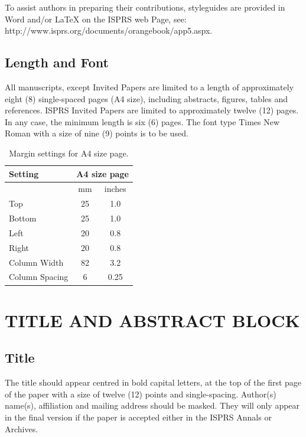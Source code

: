 \documentclass{isprs} %
\begin{document}
To assist authors in preparing their contributions, styleguides are 
provided in Word and/or LaTeX on the ISPRS web Page, see: http://www.isprs.org/documents/orangebook/app5.aspx.



\subsection{Length and Font}\label{sec:Length and Font}

All manuscripts, except Invited Papers are limited to a length of approximately eight (8) single-spaced pages (A4 size), including abstracts, figures, tables and references. ISPRS Invited Papers are limited to approximately twelve (12) pages. In any case, the minimum length is six (6) pages. The font type Times New Roman with a size of nine (9) points is to be used.

\begin{table}[h]
	\centering
		\begin{tabular}{|l|c|c|}\hline
			Setting&\multicolumn{2}{c|}{A4 size page}\\\hline
			  &mm&inches\\
			 Top&25&1.0\\
			 Bottom&25&1.0\\
			 Left&20&0.8\\
			 Right&20&0.8\\
			 Column Width&82&3.2\\
			 Column Spacing&6&0.25\\\hline
		\end{tabular}
	\caption{Margin settings for A4 size page.}
\label{tab:Margin_settings}
\end{table}

\section{TITLE AND ABSTRACT BLOCK}\label{sec:TITLE AND ABSTRACT BLOCK}

\subsection{Title}\label{sec:Title}

The title should appear centred in bold capital letters, at the top of the first page of the paper with a size of twelve (12) points and single-spacing. Author(s) name(s), affiliation and mailing address should be masked. They will only appear in the final version if the paper is accepted either in the ISPRS Annals or Archives.
\end{document}

